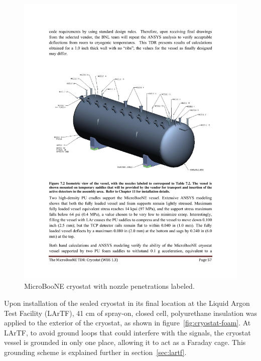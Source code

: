 \begin{figure}[htb]
\centering	
\includegraphics[width=\linewidth]{figures/cryostat_nozzles}
\caption{MicroBooNE cryostat with nozzle penetrations labeled.}
\label{fig:cryostat-drawing}
\end{figure}

Upon installation of the sealed cryostat in its final location at the Liquid Argon Test Facility (LArTF), 41 cm of spray-on, closed cell, polyurethane insulation was applied to the exterior of the cryostat, as shown in figure~\ref{fig:cryostat-foam}.  At LArTF, to avoid ground loops that could interfere with the \lartpc signals, the cryostat vessel is grounded in only one place, allowing it to act as a Faraday cage.  This grounding scheme is explained further in section~\ref{sec:lartf}.

